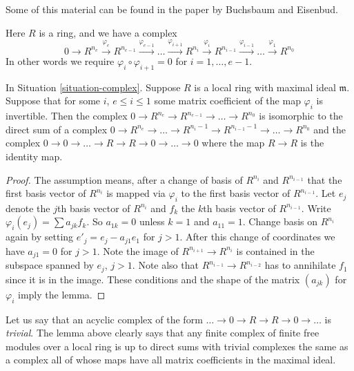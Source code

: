 \noindent
Some of this material can be found in the paper \cite{WhatExact}
by Buchsbaum and Eisenbud.

\begin{situation}
\label{situation-complex}
Here $R$ is a ring, and we have a complex
$$
0
\to
R^{n_e}
\xrightarrow{\varphi_e}
R^{n_{e-1}}
\xrightarrow{\varphi_{e-1}}
\ldots
\xrightarrow{\varphi_{i + 1}}
R^{n_i}
\xrightarrow{\varphi_i}
R^{n_{i-1}}
\xrightarrow{\varphi_{i-1}}
\ldots
\xrightarrow{\varphi_1}
R^{n_0}
$$
In other words we require $\varphi_i \circ \varphi_{i + 1} = 0$
for $i = 1, \ldots, e - 1$.
\end{situation}

\begin{lemma}
\label{lemma-add-trivial-complex}
In Situation \ref{situation-complex}.
Suppose $R$ is a local ring with maximal ideal $\mathfrak m$.
Suppose that for some $i$, $e \leq i \leq 1$
some matrix coefficient of the map $\varphi_i$ is invertible.
Then the complex $0 \to R^{n_e} \to R^{n_{e-1}} \to \ldots \to R^{n_0}$
is isomorphic to the direct sum of a complex
$0 \to R^{n_e} \to \ldots \to R^{n_i - 1} \to
R^{n_{i-1} - 1} \to \ldots \to R^{n_0}$
and the complex $0 \to 0 \to \ldots \to R \to R \to 0 \to \ldots \to 0$
where the map $R \to R$ is the identity map.
\end{lemma}

\begin{proof}
The assumption means, after a change of basis of
$R^{n_i}$ and $R^{n_{i-1}}$ that the first basis
vector of $R^{n_i}$ is mapped via $\varphi_i$ to the first basis
vector of $R^{n_{i-1}}$. Let $e_j$ denote the
$j$th basis vector of $R^{n_i}$ and $f_k$ the $k$th
basis vector of $R^{n_{i-1}}$. Write $\varphi_i(e_j)
= \sum a_{jk} f_k$. So $a_{1k} = 0$ unless $k = 1$
and $a_{11} = 1$. Change basis on $R^{n_i}$ again
by setting $e'_j = e_j - a_{j1} e_1$ for $j > 1$.
After this change of coordinates we have $a_{j1} = 0$
for $j > 1$. Note the image
of $R^{n_{i + 1}} \to R^{n_i}$ is contained in the
subspace spanned by $e_j$, $j > 1$. Note also
that $R^{n_{i-1}} \to R^{n_{i-2}}$ has to annihilate
$f_1$ since it is in the image. These conditions
and the shape of the matrix $(a_{jk})$ for $\varphi_i$
imply the lemma.
\end{proof}

\noindent
Let us say that an acyclic complex of the form
$\ldots \to 0 \to R \to R \to 0 \to \ldots $
is {\it trivial}. The lemma above clearly says that
any finite complex of finite free modules over a local ring is up to direct
sums with trivial complexes the same as a complex
all of whose maps have all matrix coefficients in
the maximal ideal.

